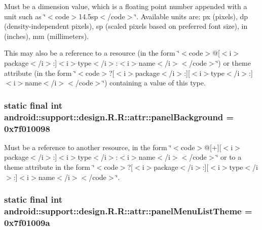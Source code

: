 Must be a dimension value, which is a floating point number appended with a unit such as \char`\"{}$<$code$>$14.5sp$<$/code$>$\char`\"{}. Available units are: px (pixels), dp (density-independent pixels), sp (scaled pixels based on preferred font size), in (inches), mm (millimeters). 

This may also be a reference to a resource (in the form \char`\"{}$<$code$>$@\mbox{[}$<$i$>$package$<$/i$>$:\mbox{]}$<$i$>$type$<$/i$>$:$<$i$>$name$<$/i$>$$<$/code$>$\char`\"{}) or theme attribute (in the form \char`\"{}$<$code$>$?\mbox{[}$<$i$>$package$<$/i$>$:\mbox{]}\mbox{[}$<$i$>$type$<$/i$>$:\mbox{]}$<$i$>$name$<$/i$>$$<$/code$>$\char`\"{}) containing a value of this type. \hypertarget{classandroid_1_1support_1_1design_1_1_r_1_1attr_866717351dcb76a00fd47a2e65ecda37}{
\subsubsection[{panelBackground}]{\setlength{\rightskip}{0pt plus 5cm}static final int android::support::design.R.R::attr::panelBackground = 0x7f010098}}
\label{classandroid_1_1support_1_1design_1_1_r_1_1attr_866717351dcb76a00fd47a2e65ecda37}


Must be a reference to another resource, in the form \char`\"{}$<$code$>$@\mbox{[}+\mbox{]}\mbox{[}$<$i$>$package$<$/i$>$:\mbox{]}$<$i$>$type$<$/i$>$:$<$i$>$name$<$/i$>$$<$/code$>$\char`\"{} or to a theme attribute in the form \char`\"{}$<$code$>$?\mbox{[}$<$i$>$package$<$/i$>$:\mbox{]}\mbox{[}$<$i$>$type$<$/i$>$:\mbox{]}$<$i$>$name$<$/i$>$$<$/code$>$\char`\"{}. \hypertarget{classandroid_1_1support_1_1design_1_1_r_1_1attr_58f57a3f773296d7455693e1528d0774}{
\subsubsection[{panelMenuListTheme}]{\setlength{\rightskip}{0pt plus 5cm}static final int android::support::design.R.R::attr::panelMenuListTheme = 0x7f01009a}}
\label{classandroid_1_1support_1_1design_1_1_r_1_1attr_58f57a3f773296d7455693e1528d0774}


